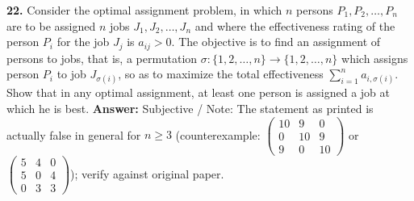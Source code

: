 \documentclass[11pt,a4paper]{article}
\newcommand{\ans}[1]{\textbf{Answer:} #1\par\medskip}
\begin{document}
\textbf{22.} Consider the optimal assignment problem, in which $n$ persons $P_1, P_2, \dots, P_n$ are to be assigned $n$ jobs $J_1, J_2, \dots, J_n$ and where the effectiveness rating of the person $P_i$ for the job $J_j$ is $a_{ij} > 0$. The objective is to find an assignment of persons to jobs, that is, a permutation $\sigma : \{1, 2, \dots, n\} \to \{1, 2, \dots, n\}$ which assigns person $P_i$ to job $J_{\sigma(i)}$, so as to maximize the total effectiveness $\displaystyle\sum_{i=1}^{n} a_{i,\sigma(i)}$. Show that in any optimal assignment, at least one person is assigned a job at which he is best.
\ans{Subjective / Note: The statement as printed is actually false in general for $n \ge 3$ (counterexample: $\begin{pmatrix} 10 & 9 & 0 \\ 0 & 10 & 9 \\ 9 & 0 & 10 \end{pmatrix}$ or $\begin{pmatrix} 5 & 4 & 0 \\ 5 & 0 & 4 \\ 0 & 3 & 3 \end{pmatrix}$); verify against original paper.}
\end{document}
